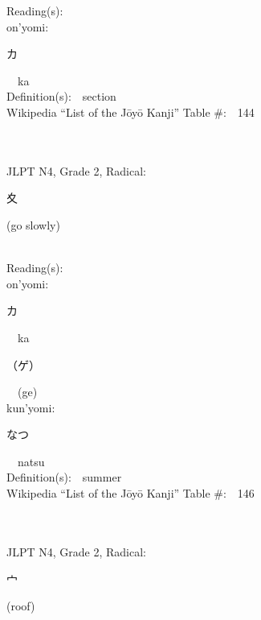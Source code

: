\begin{multicols}{2}
Reading(s):\ \ \\
{\hspace*{1em}}on'yomi:\ \ \\
{\hspace*{2em}}{\begin{CJK}{UTF8}{min} カ \end{CJK}}\ \ ka\ \ \\
Definition(s):\ \ section \\
Wikipedia ``List of the J\=oy\=o Kanji'' Table \#:\ \ 144 \\
\ \ \\
{\fontsize{34pt}{40pt}  }\ \ \\  %
{JLPT N4, Grade 2, Radical:\ \ {\begin{CJK}{UTF8}{min} 夊 \end{CJK}} (go slowly) } \\
Reading(s):\ \ \\
{\hspace*{1em}}on'yomi:\ \ \\
{\hspace*{2em}}{\begin{CJK}{UTF8}{min} カ \end{CJK}}\ \ ka\ \ \\
{\hspace*{2em}}{\begin{CJK}{UTF8}{min} （ゲ） \end{CJK}}\ \ (ge)\ \ \\
{\hspace*{1em}}kun'yomi:\ \ \\
{\hspace*{2em}}{\begin{CJK}{UTF8}{min} なつ \end{CJK}}\ \ natsu\ \ \\
Definition(s):\ \ summer \\
Wikipedia ``List of the J\=oy\=o Kanji'' Table \#:\ \ 146 \\
\ \ \\
{\fontsize{34pt}{40pt}  }\ \ \\  %
{JLPT N4, Grade 2, Radical:\ \ {\begin{CJK}{UTF8}{min} 宀 \end{CJK}} (roof) } \\

\end{multicols}
